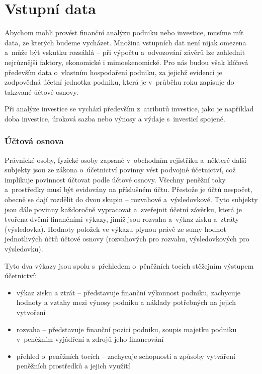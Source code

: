\section{Vstupní data}
Abychom mohli provést finanční analýzu podniku nebo investice, musíme mít data, ze kterých budeme vycházet. Množina vstupních dat není nijak omezena a~může být vskutku rozsáhlá -- při výpočtu a~odvozování závěrů lze zohlednit nejrůznější faktory, ekonomické i mimoekenomické. Pro nás budou však klíčová především data o~vlastním hospodaření podniku, za jejichž evidenci je zodpovědná účetní jednotka podniku, která je v~průběhu roku zapisuje do takzvané účtové osnovy. 

Při analýze investice se vychází především z~atributů investice, jako je například doba investice, úroková sazba nebo výnosy a výdaje s~investicí spojené.

\subsubsection{Účtová osnova}
Právnické osoby, fyzické osoby zapsané v~obchodním rejistříku a~některé další subjekty jsou ze zákona o~účetnictví povinny vést podvojné účetnictví, což implikuje povinnost účtovat podle účtové osnovy. Všechny peněžní toky a~prostředky musí být evidovány na příslušném účtu. Přestože je účtů nespočet, obecně se dají rozdělit do dvou skupin -- rozvahové a~výsledovkové. Tyto subjekty jsou dále povinny každoročně vypracovat a~zveřejnit účetní závěrku, která je tvořena dvěmi finančními výkazy, jimiž jsou rozvaha a~výkaz zisku a~ztráty (výsledovka). Hodnoty položek ve výkazu plynou právě ze sumy hodnot jednotlivých účtů účtové osnovy (rozvahových pro rozvahu, výsledovkových pro výsledovku).

Tyto dva výkazy jsou spolu s~přehledem o~pěněžních tocích stěžejním výstupem účetnictví:

\begin{itemize}
	\item výkaz zisku a ztrát -- představuje finanční výkonnost podniku, zachycuje hodnoty a vztahy mezi výnosy podniku a náklady potřebných na jejich vytvoření
	\item rozvaha -- představuje finanční pozici podniku, soupis majetku podniku v~peněžním vyjádření a zdrojů jeho financování
	\item přehled o~peněžních tocích -- zachycuje schopnosti a způsoby vytváření peněžních prostředků a jejich využití
\end{itemize}


